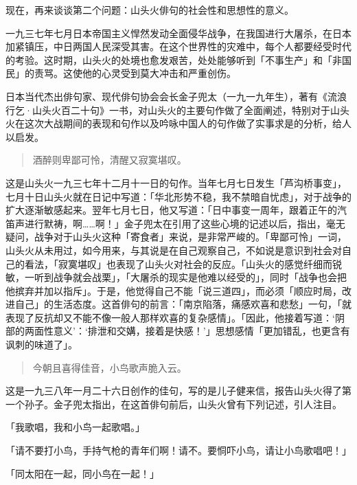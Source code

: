{    现在，再来谈谈第二个问题：山头火俳句的社会性和思想性的意义。

    一九三七年七月日本帝国主义悍然发动全面侵华战争，在我国进行大屠杀，在日本加紧镇压，中日两国人民深受其害。在这个世界性的灾难中，每个人都要经受时代的考验。这时期，山头火的处境也愈发艰苦，处处能够听到「不事生产」和「非国民」的责骂。这使他的心灵受到莫大冲击和严重创伤。

    日本当代杰出俳句家、现代俳句协会会长金子兜太（一九一九年生），著有《流浪行乞·山头火百二十句》一书，对山头火的主要句作做了全面阐述，特别对于山头火在这次大战期间的表现和句作以及吟咏中国人的句作做了实事求是的分析，给人以启发。
    \begin{quote}
        酒醉则卑鄙可怜，清醒又寂寞堪叹。
    \end{quote}

    这是山头火一九三七年十二月十一日的句作。当年七月七日发生「芦沟桥事变」，七月十日山头火就在日记中写道：「华北形势不稳，我不禁暗自忧虑」，对于战争的扩大逐渐敏感起来。翌年七月七日，他又写道：「日中事变一周年，跟着正午的汽笛声进行默祷\footnotemark[10]，啊……啊！」金子兜太在引用了这些心境的记述以后，指出，毫无疑问，战争对于山头火这种「寄食者」来说，是非常严峻的。「卑鄙可怜」一词，山头火从未用过，如今用来，与其说是在自己观察自己，不如说是意识到社会对自己的看法，「寂寞堪叹」也表现了山头火对社会的反应。「山头火的感觉纤细而锐敏，一听到战争就会战栗」，「大屠杀的现实是他难以经受的」，同时「战争也会把他摈弃并加以指斥」。于是，他觉得自己不能「说三道四」，而必须「顺应时局，改进自己」的生活态度。这首俳句的前言：「南京陷落，痛感欢喜和悲愁」一句，「就表现了反抗却又不能不像一般人那样欢喜的复杂感情」。「因此，他接着写道：‘阴部的两面性意义’：‘排泄和交媾，接着是快感！’」思想感情「更加错乱，也更含有讽刺的味道了」。


    \begin{quote}
        今朝且喜得佳音，小鸟歌声脆入云。
    \end{quote}

    这是一九三八年一月二十六日创作的佳句，写的是儿子健来信，报告山头火得了第一个孙子。金子兜太指出，在这首俳句前后，山头火曾有下列记述，引人注目。

    「我歌唱，我和小鸟一起歌唱。」

    「请不要打小鸟，手持气枪的青年们啊！请不。要恫吓小鸟，请让小鸟歌唱吧！」

    「同太阳在一起，同小鸟在一起！」

}
